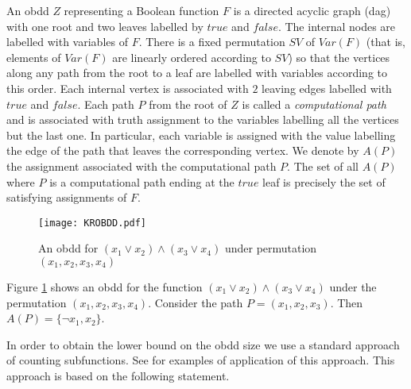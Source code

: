 \documentclass{article}
\begin{document}
An {\sc obdd} $Z$ representing a Boolean function $F$ is a directed acyclic graph ({\sc dag}) with one root and two leaves
labelled by $true$ and $false$. 
The internal nodes are labelled with variables of $F$. There is a fixed permutation $SV$ of $Var(F)$
(that is, elements of $Var(F)$ are linearly ordered according to $SV$)
so that the vertices along any path from the root to a leaf are labelled with variables according to this order. 
Each internal vertex is associated with $2$ leaving edges labelled with $true$ and $false$.
Each path $P$ from the root of $Z$ is called a \emph{computational path} and is associated with truth assignment to
the variables labelling all the vertices but the last one. In particular, each variable is assigned with the value labelling
the edge of the path that leaves the corresponding vertex. We denote by $A(P)$ the assignment associated with the 
computational path $P$. The set of all $A(P)$ where $P$ is a computational path ending at the $true$ leaf is precisely
the set of satisfying assignments of $F$. 

\begin{figure}[h]
\centering 
\texttt{[image: KROBDD.pdf]}
\caption{An {\sc obdd} for $(x_1 \vee x_2) \wedge(x_3 \vee x_4)$
under permutation $(x_1,x_2,x_3,x_4)$}
\label{OBDDPic}
\end{figure}

Figure \ref{OBDDPic} shows an {\sc obdd} for the function $(x_1 \vee x_2) \wedge (x_3 \vee x_4)$
under the permutation $(x_1,x_2,x_3,x_4)$. Consider the path $P=(x_1,x_2,x_3)$. 
Then $A(P)=\{\neg x_1,x_2\}$. 

\begin{comment}
Consider an arbitrary internal vertex of $Z$, not necessarily the root and let
$Z'$ be the induced subgraph of $Z$ (retaining the labeling on vertices and edges) consisting of all vertices reachable
from $u$. It is not hard to see that $Z'$ is an {\sc obdd}. Moreover, let $P$ be a path from the root of $Z$ to $u$.
Then it is not hard to see that the function $F'$ represented by $Z'$ if $F_{A(P)}$. This observation implies
a corollary leading to a widely used approach to establishing lower bounds on {\sc obdds}, 
\end{comment}

In order to obtain the lower bound on the {\sc obdd} size we use a standard approach
of counting subfunctions. See \cite{WegBook} for examples of application of this approach.
This approach is based on the following statement.
\end{document}
